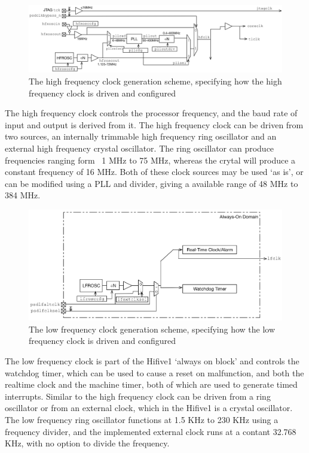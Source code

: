\begin{figure}[H]
    \includegraphics[width=0.9\columnwidth]{figures/hfclock.png}
    \caption[High Frequency Clock Diagram]{The high frequency clock generation scheme, specifying how the high frequency clock is driven and configured}
\end{figure}
The high frequency clock controls the processor frequency, and the baud rate of input and output is derived from it. The high frequency clock can be driven from two sources, an internally trimmable high frequency ring oscillator and an external high frequency crystal oscillator. The ring oscillator can produce frequencies ranging form ~1 MHz to 75 MHz, whereas the crytal will produce a constant frequency of 16 MHz. Both of these clock sources may be used `as is', or can be modified using a PLL and divider, giving a available range of 48 MHz to 384 MHz. 
\\
\begin{figure}[H]
    \includegraphics[width=0.9\columnwidth]{figures/lfclock.png}
    \caption[Low Frequency Clock Diagram]{The low frequency clock generation scheme, specifying how the low frequency clock is driven and configured}
\end{figure}
The low frequency clock is part of the Hifive1 `always on block' and controls the watchdog timer, which can be used to cause a reset on malfunction, and both the realtime clock and the machine timer, both of which are used to generate timed interrupts. Similar to the high frequency clock can be driven from a ring oscillator or from an external clock, which in the Hifive1 is a crystal oscillator. The low frequency ring oscillator functions at 1.5 KHz to 230 KHz using a frequency divider, and the implemented external clock runs at a contant 32.768 KHz, with no option to divide the frequency.
